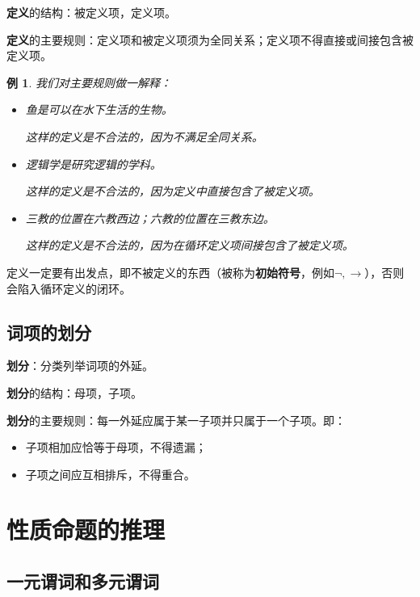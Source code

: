 \documentclass[12pt,onecolumn,a4paper]{book}
\newtheorem*{example}{例}
\numberwithin{table}{subsection}
\numberwithin{equation}{subsection}
\begin{document}
\textbf{定义}的结构：被定义项，定义项。

\textbf{定义}的主要规则：定义项和被定义项须为全同关系；定义项不得直接或间接包含被定义项。

\begin{example}
    我们对主要规则做一解释：
    \begin{itemize}[itemsep=0pt,parsep=0pt]
        \item 鱼是可以在水下生活的生物。
        
        这样的定义是不合法的，因为不满足全同关系。

        \item 逻辑学是研究逻辑的学科。
        
        这样的定义是不合法的，因为定义中直接包含了被定义项。

        \item 三教的位置在六教西边；六教的位置在三教东边。
        
        这样的定义是不合法的，因为在循环定义项间接包含了被定义项。
    \end{itemize}
\end{example}

定义一定要有出发点，即不被定义的东西（被称为\textbf{初始符号}，例如$\neg ,\rightarrow$），否则会陷入循环定义的闭环。

\section{词项的划分}

\textbf{划分}：分类列举词项的外延。

\textbf{划分}的结构：母项，子项。

\textbf{划分}的主要规则：每一外延应属于某一子项并只属于一个子项。即：
\begin{itemize}[itemsep=0pt,parsep=0pt]
    \item 子项相加应恰等于母项，不得遗漏；
    \item 子项之间应互相排斥，不得重合。
\end{itemize}

\chapter{性质命题的推理}\label{chap6}

\section{一元谓词和多元谓词}
\end{document}

